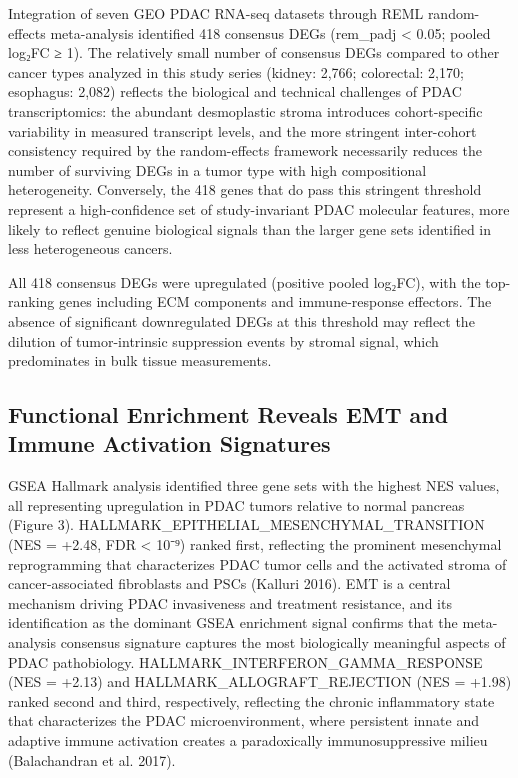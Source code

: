 \documentclass[
  12pt,
]{article}
\begin{document}
Integration of seven GEO PDAC RNA-seq datasets through REML
random-effects meta-analysis identified 418 consensus DEGs (rem\_padj
\textless{} 0.05; \textbar pooled log₂FC\textbar{} ≥ 1). The relatively
small number of consensus DEGs compared to other cancer types analyzed
in this study series (kidney: 2,766; colorectal: 2,170; esophagus:
2,082) reflects the biological and technical challenges of PDAC
transcriptomics: the abundant desmoplastic stroma introduces
cohort-specific variability in measured transcript levels, and the more
stringent inter-cohort consistency required by the random-effects
framework necessarily reduces the number of surviving DEGs in a tumor
type with high compositional heterogeneity. Conversely, the 418 genes
that do pass this stringent threshold represent a high-confidence set of
study-invariant PDAC molecular features, more likely to reflect genuine
biological signals than the larger gene sets identified in less
heterogeneous cancers.

All 418 consensus DEGs were upregulated (positive pooled log₂FC), with
the top-ranking genes including ECM components and immune-response
effectors. The absence of significant downregulated DEGs at this
threshold may reflect the dilution of tumor-intrinsic suppression events
by stromal signal, which predominates in bulk tissue measurements.

\subsection{Functional Enrichment Reveals EMT and Immune Activation
Signatures}\label{functional-enrichment-reveals-emt-and-immune-activation-signatures}

GSEA Hallmark analysis identified three gene sets with the highest NES
values, all representing upregulation in PDAC tumors relative to normal
pancreas (Figure 3). HALLMARK\_EPITHELIAL\_MESENCHYMAL\_TRANSITION (NES
= +2.48, FDR \textless{} 10⁻⁹) ranked first, reflecting the prominent
mesenchymal reprogramming that characterizes PDAC tumor cells and the
activated stroma of cancer-associated fibroblasts and PSCs (Kalluri
2016). EMT is a central mechanism driving PDAC invasiveness and
treatment resistance, and its identification as the dominant GSEA
enrichment signal confirms that the meta-analysis consensus signature
captures the most biologically meaningful aspects of PDAC pathobiology.
HALLMARK\_INTERFERON\_GAMMA\_RESPONSE (NES = +2.13) and
HALLMARK\_ALLOGRAFT\_REJECTION (NES = +1.98) ranked second and third,
respectively, reflecting the chronic inflammatory state that
characterizes the PDAC microenvironment, where persistent innate and
adaptive immune activation creates a paradoxically immunosuppressive
milieu (Balachandran et al. 2017).
\end{document}
